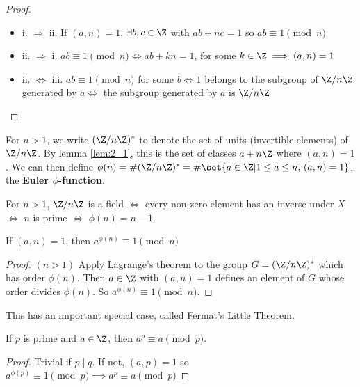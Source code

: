 \documentclass{article}
\begin{document}
\begin{proof}
    \leavevmode
    \begin{itemize}[label={}]
        \item i. $\Rightarrow$ ii. If $(a, n) = 1$, $\exists b, c \in \Z$ with $ab+nc=1$ so $ab \equiv 1 \pmod{n}$
        \item ii. $\Rightarrow$ i. $ab \equiv 1 \pmod{n} \iff ab+kn=1$, for some $k \in \Z \implies (a, n)= 1$
        \item ii. $\Leftrightarrow$ iii. $ab \equiv 1 \pmod{n}$ for some $b \iff 1$ belongs to the subgroup of $\Z / n \Z$ generated by $a \iff$ the subgroup generated by $a$ is $\Z / n \Z$
    \end{itemize}
\end{proof}

\begin{notation}
    For $n > 1$, we write $(\Z / n \Z)^*$ to denote the set of units (invertible elements) of $\Z / n \Z$. By lemma \ref{lem:2_1}, this is the set of classes $a + n \Z$ where $(a, n) = 1$.
    We can then define $\phi(n) =\# (\Z / n \Z)^* = \# \set{a \in \Z | 1 \leq a \leq n, \, (a, n) = 1}$, the \textbf{Euler $\phi$-function}.
\end{notation}

\begin{remark}
    For $n>1$, $\Z/n\Z$ is a field $\iff$ every non-zero element has an inverse under $X$ $\iff$ $n$ is prime $\iff$ $\phi(n) = n-1$.
\end{remark}

\begin{thm}
    If $(a, n) = 1$, then $a^{\phi(n)} \equiv 1 \pmod{n}$
\end{thm}

\begin{proof}
    $(n>1)$ Apply Lagrange's theorem to the group $G = (\Z/n\Z)^*$ which has order $\phi(n)$. Then $a \in \Z$ with $(a, n) = 1$ defines an element of $G$ whose order divides $\phi(n)$. So $a^{\phi(n)} \equiv 1 \pmod{n}$.
\end{proof}

This has an important special case, called Fermat's Little Theorem.
\begin{thm}
    If $p$ is prime and $a \in \Z$, then $a^p \equiv a \pmod{p}$.
\end{thm}

\begin{proof}
    Trivial if $p \mid q$.  If not, $(a, p) = 1$ so $a^{\phi(p)} \equiv 1 \pmod{p} \implies a^p \equiv a \pmod{p}$
\end{proof}
\end{document}
